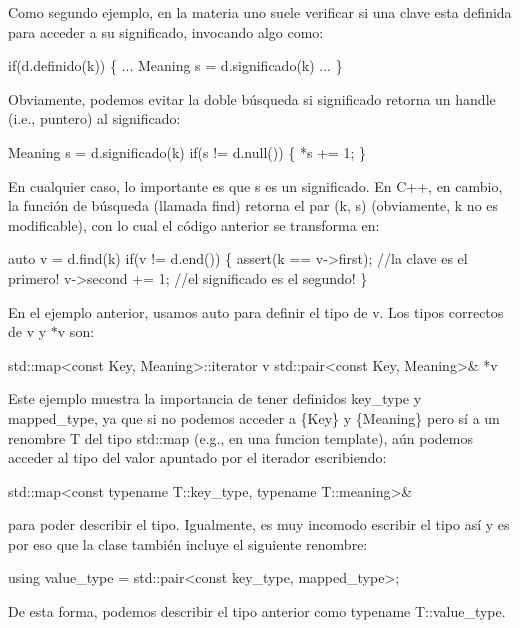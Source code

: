Como segundo ejemplo, en la materia uno suele verificar si una clave esta definida para acceder a su significado, invocando algo como\+: 
\begin{DoxyCode}
if(d.definido(k)) \{ ... Meaning s = d.significado(k) ... \}
\end{DoxyCode}
 Obviamente, podemos evitar la doble búsqueda si {\ttfamily significado} retorna un handle (i.\+e., puntero) al significado\+: 
\begin{DoxyCode}
Meaning s = d.significado(k)
if(s != d.null()) \{ *s += 1; \}
\end{DoxyCode}
 En cualquier caso, lo importante es que {\ttfamily s} es un significado. En C++, en cambio, la función de búsqueda (llamada {\ttfamily find}) retorna el par {\ttfamily (k, s)} (obviamente, {\ttfamily k} no es modificable), con lo cual el código anterior se transforma en\+: 
\begin{DoxyCode}
\textcolor{keyword}{auto} v = d.find(k)
\textcolor{keywordflow}{if}(v != d.end()) \{
   assert(k == v->first); \textcolor{comment}{//la clave es el primero!}
   v->second += 1;        \textcolor{comment}{//el significado es el segundo!}
\}
\end{DoxyCode}


En el ejemplo anterior, usamos {\ttfamily auto} para definir el tipo de {\ttfamily v}. Los tipos correctos de {\ttfamily v} y {\ttfamily $\ast$v} son\+: 
\begin{DoxyCode}
std::map<const Key, Meaning>::iterator v
std::pair<const Key, Meaning>& *v
\end{DoxyCode}
 Este ejemplo muestra la importancia de tener definidos {\ttfamily key\+\_\+type} y {\ttfamily mapped\+\_\+type}, ya que si no podemos acceder a \{Key\} y \{Meaning\} pero sí a un renombre T del tipo std\+::map (e.\+g., en una funcion template), aún podemos acceder al tipo del valor apuntado por el iterador escribiendo\+: 
\begin{DoxyCode}
std::map<const typename T::key\_type, typename T::meaning>&
\end{DoxyCode}
 para poder describir el tipo. Igualmente, es muy incomodo escribir el tipo así y es por eso que la clase también incluye el siguiente renombre\+: 
\begin{DoxyCode}
\textcolor{keyword}{using} value\_type = std::pair<const key\_type, mapped\_type>;
\end{DoxyCode}
 De esta forma, podemos describir el tipo anterior como {\ttfamily typename T\+::value\+\_\+type}.


